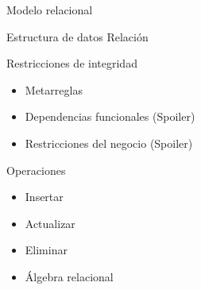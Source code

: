 \begin{frame}{Modelo relacional}
    \begin{overlayarea}{\linewidth}{\textheight}
        \begin{block}{Estructura de datos}
           Relaci\'on
        \end{block}

        \begin{block}{Restricciones de integridad}
            \begin{itemize}
                \item Metarreglas
                \item Dependencias funcionales (Spoiler)
                \item Restricciones del negocio (Spoiler)
            \end{itemize}
            
        \end{block}

        \begin{block}{Operaciones}
            \begin{itemize}
                \item Insertar
                \item Actualizar
                \item Eliminar
                \item \'Algebra relacional
            \end{itemize}
        \end{block}
    \end{overlayarea}

\end{frame}